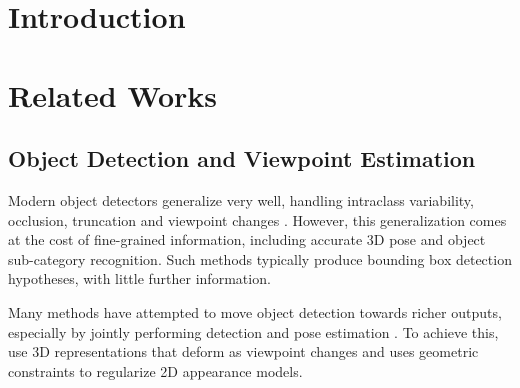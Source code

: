 \documentclass[10pt,twocolumn,letterpaper]{article}
\begin{document}
\begin{abstract}

\end{abstract}

\section{Introduction}
\label{sec:intro}


\section{Related Works}


\subsection{Object Detection and Viewpoint Estimation}

Modern object detectors generalize very well, handling intraclass variability,
occlusion, truncation and viewpoint changes \cite{Felzenszwalb10, Girshick14}.
However, this generalization comes at the cost of fine-grained information,
including accurate 3D pose and object sub-category recognition. Such methods
typically produce bounding box detection hypotheses, with little further
information.

Many methods have attempted to move object detection towards richer outputs,
especially by jointly performing detection and pose estimation \cite{Pepik12,
Xiang12, Fidler12, Xiang14, Hejrati14, Aubry14, Lim14}. To achieve this,
\cite{Xiang12, Hejrati14, Fidler12} use 3D representations that deform as
viewpoint changes and \cite{Pepik12} uses geometric constraints to regularize 2D
appearance models.
\end{document}
